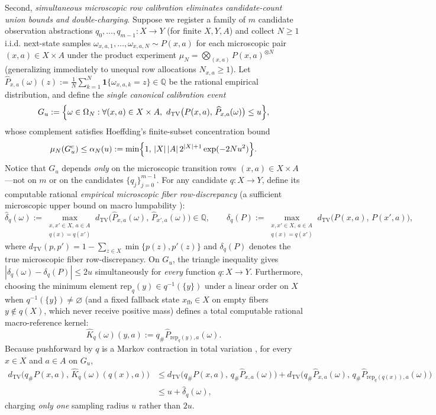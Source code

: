 \documentclass[11pt,a4paper]{article}
\begin{document}
Second, \emph{simultaneous microscopic row calibration eliminates
candidate-count union bounds and double-charging}. Suppose we register a
family of \(m\) candidate observation abstractions
\(q_0, \dots, q_{m-1}: X \to Y\) (for finite \(X, Y, A\)) and collect
\(N \ge 1\) i.i.d. next-state samples
\(\omega_{x,a,1}, \dots, \omega_{x,a,N} \sim P(x,a)\) for each
microscopic pair \((x,a) \in X \times A\) under the product experiment
\(\mu_N = \bigotimes_{(x,a)} P(x,a)^{\otimes N}\) (generalizing
immediately to unequal row allocations \(N_{x,a} \ge 1\)). Let
\(\widehat{P}_{x,a}(\omega)(z) := \frac{1}{N}\sum_{k=1}^N \mathbf{1}\{\omega_{x,a,k} = z\} \in \mathbb{Q}\)
be the rational empirical distribution, and define the \emph{single
canonical calibration event}
\[G_u := \Bigl\{\omega \in \Omega_N : \forall (x,a) \in X \times A,\ d_{\mathrm{TV}}\bigl(P(x,a),\, \widehat{P}_{x,a}(\omega)\bigr) \le u\Bigr\},\]
whose complement satisfies Hoeffding's finite-subset concentration bound
\citep{hoeffding1963}
\[\mu_N(G_u^c) \le \alpha_N(u) := \min\Bigl\{1,\, |X|\,|A|\, 2^{|X|+1} \exp(-2 N u^2)\Bigr\}.\]
Notice that \(G_u\) depends \emph{only} on the microscopic transition
rows \((x,a) \in X \times A\)---not on \(m\) or on the candidates
\(\{q_j\}_{j=0}^{m-1}\). For any candidate \(q: X \to Y\), define its
computable rational \emph{empirical microscopic fiber row-discrepancy}
(a sufficient microscopic upper bound on macro lumpability
\citep{burkeRosenblatt1958, ferns2004, ravindranBarto2004}):
\[\widehat{\delta}_q(\omega) := \max_{\substack{x, x' \in X,\, a \in A \\ q(x) = q(x')}} d_{\mathrm{TV}}\bigl(\widehat{P}_{x,a}(\omega),\, \widehat{P}_{x',a}(\omega)\bigr) \in \mathbb{Q},
\qquad
\delta_q(P) := \max_{\substack{x, x' \in X,\, a \in A \\ q(x) = q(x')}} d_{\mathrm{TV}}\bigl(P(x,a),\, P(x',a)\bigr),\]
where
\(d_{\mathrm{TV}}(p, p') = 1 - \sum_{z \in X} \min\{p(z), p'(z)\}\) and
\(\delta_q(P)\) denotes the true microscopic fiber row-discrepancy. On
\(G_u\), the triangle inequality gives
\(|\widehat{\delta}_q(\omega) - \delta_q(P)| \le 2u\) simultaneously for
\emph{every} function \(q: X \to Y\). Furthermore, choosing the minimum
element \(\mathrm{rep}_q(y) \in q^{-1}(\{y\})\) under a linear order on
\(X\) when \(q^{-1}(\{y\}) \neq \varnothing\) (and a fixed fallback
state \(x_{\mathrm{fb}} \in X\) on empty fibers \(y \notin q(X)\), which
never receive positive mass) defines a total computable rational
macro-reference kernel:
\[\widehat{K}_q(\omega)(y, a) := q_\# \widehat{P}_{\mathrm{rep}_q(y), a}(\omega).\]
Because pushforward by \(q\) is a Markov contraction in total variation
\citep{dobrushin1956, pinsker1964}, for every \(x \in X\) and
\(a \in A\) on \(G_u\), \[\begin{aligned}
d_{\mathrm{TV}}\bigl(q_\# P(x,a),\, \widehat{K}_q(\omega)(q(x), a)\bigr)
&\le d_{\mathrm{TV}}\bigl(q_\# P(x,a),\, q_\# \widehat{P}_{x,a}(\omega)\bigr)
   + d_{\mathrm{TV}}\bigl(q_\# \widehat{P}_{x,a}(\omega),\, q_\# \widehat{P}_{\mathrm{rep}_q(q(x)), a}(\omega)\bigr) \\
&\le u + \widehat{\delta}_q(\omega),
\end{aligned}\] charging \emph{only one} sampling radius \(u\) rather
than \(2u\).
\end{document}
